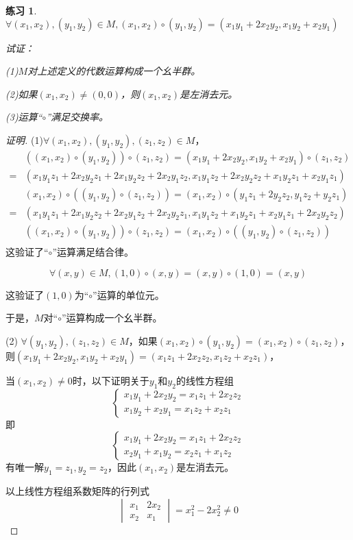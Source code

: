 \documentclass{article}
\newtheorem{Exercise}{练习}
\begin{document}
\begin{CJK*}{UTF8}{gbsn}
\begin{Exercise}
  $\forall (x_1,x_2), (y_1,y_2)\in M, (x_1,x_2)\circ (y_1,y_2)=(x_1y_1+2x_2y_2,x_1y_2+x_2y_1)$

  试证：

  (1)$M$对上述定义的代数运算构成一个幺半群。

  (2)如果$(x_1,x_2)\neq (0,0)$，则$(x_1,x_2)$是左消去元。

  (3)运算“$\circ$”满足交换率。
\end{Exercise}
\begin{proof}[证明]
  (1)$\forall (x_1,x_2), (y_1,y_2),(z_1,z_2)\in M$，
  \begin{align*}
    &((x_1,x_2)\circ (y_1,y_2))\circ (z_1,z_2) = (x_1y_1+2x_2y_2,x_1y_2+x_2y_1)\circ (z_1,z_2)\\
     =& (x_1y_1z_1+2x_2y_2z_1+2x_1y_2z_2+2x_2y_1z_2,x_1y_1z_2+2x_2y_2z_2+x_1y_2z_1+x_2y_1z_1)\\
     &(x_1,x_2)\circ ((y_1,y_2)\circ (z_1,z_2)) = (x_1,x_2)\circ (y_1z_1+2y_2z_2,y_1z_2+y_2z_1)\\
     =&(x_1y_1z_1+2x_1y_2z_2+2x_2y_1z_2+2x_2y_2z_1,x_1y_1z_2+x_1y_2z_1+x_2y_1z_1+2x_2y_2z_2)\\
  &((x_1,x_2)\circ (y_1,y_2))\circ (z_1,z_2) = (x_1,x_2)\circ ((y_1,y_2)\circ (z_1,z_2))\\
    \end{align*}
    这验证了“$\circ$”运算满足结合律。

  \[\forall (x,y)\in M,(1,0)\circ (x,y) = (x,y)\circ (1,0) = (x,y)\]
  
  这验证了$(1,0)$为“$\circ$”运算的单位元。
    
    
    于是，$M$对“$\circ$”运算构成一个幺半群。

(2) $\forall (y_1,y_2),(z_1,z_2)\in M$，如果$(x_1,x_2)\circ (y_1,y_2)=(x_1,x_2)\circ (z_1,z_2)$，
则$(x_1y_1+2x_2y_2,x_1y_2+x_2y_1)=(x_1z_1+2x_2z_2,x_1z_2+x_2z_1)$，

当$(x_1,x_2)\neq 0$时，以下证明关于$y_1$和$y_2$的线性方程组
\[
\begin{cases}
  x_1y_1+2x_2y_2=x_1z_1+2x_2z_2\\
  x_1y_2+x_2y_1=x_1z_2+x_2z_1
\end{cases}\]
即
\[
\begin{cases}
  x_1y_1+2x_2y_2=x_1z_1+2x_2z_2\\
  x_2y_1+x_1y_2=x_2z_1+x_1z_2
\end{cases}\]
有唯一解$y_1=z_1,y_2=z_2$，因此$(x_1,x_2)$是左消去元。

以上线性方程组系数矩阵的行列式
\[\begin{vmatrix}x_1&2x_2\\x_2&x_1\end{vmatrix}=x_1^2-2x_2^2\neq 0\]


\end{proof}
\end{CJK*}
\end{document}
